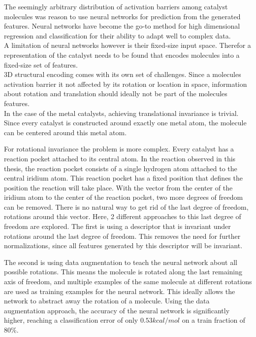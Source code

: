 The seemingly arbitrary distribution of activation barriers among catalyst molecules  was reason to use neural networks for prediction from the generated features.
Neural networks have become the go-to method for high dimensional regression and classification for their ability to adapt well to complex data.
\\
A limitation of neural networks however is their fixed-size input space.
Therefor a representation of the catalyst needs to be found that encodes molecules into a fixed-size set of features.
\\
3D structural encoding comes with its own set of challenges. 
Since a molecules activation barrier it not affected by its rotation or location in space, 
information about rotation and translation should ideally not be part of the molecules features.
\\
In the case of the metal catalysts, achieving translational invariance is trivial.
Since every catalyst is constructed around exactly one metal atom, the molecule can be centered around this metal atom.

For rotational invariance the problem is more complex.
Every catalyst has a reaction pocket attached to its central atom.
In the reaction observed in this thesis, the reaction pocket consists of a single hydrogen atom attached to the central iridium atom.
This reaction pocket has a fixed position that defines the position the reaction will take place.
With the vector from the center of the iridium atom to the center of the reaction pocket, two more degrees of freedom can be removed.
There is no natural way to get rid of the last degree of freedom, rotations around this vector.
Here, 2 different approaches to this last degree of freedom are explored.
The first is using a descriptor that is invariant under rotations around the last degree of freedom.
This removes the need for further normalizations, since all features generated by this descriptor will be invariant.

The second is using data augmentation to teach the neural network about all possible rotations.
This means the molecule is rotated along the last remaining axis of freedom, and multiple examples of the same molecule at different rotations are used as training examples for the neural network.
This ideally allows the network to abstract away the rotation of a molecule.
Using the data augmentation approach, the accuracy of the neural network is significantly higher, reaching a classification error of only  $0.53 kcal/mol$ on a train fraction of 80\%.


